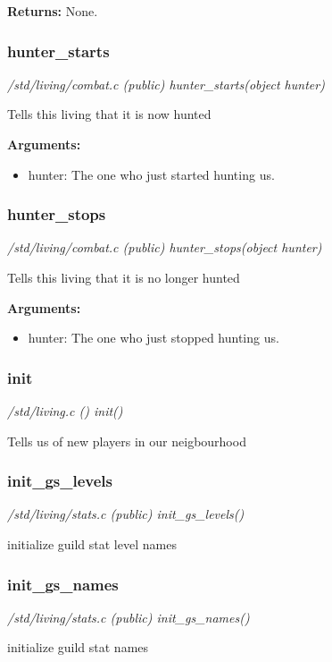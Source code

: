 {\bf Returns:}        None.


\subsubsection{hunter\_starts}

{\em /std/living/combat.c (public) hunter\_starts(object hunter)}

Tells this living that it is now hunted

{\bf Arguments:}
\begin{itemize}
\item     hunter: The one who just started hunting us.
\end{itemize}


\subsubsection{hunter\_stops}

{\em /std/living/combat.c (public) hunter\_stops(object hunter)}

Tells this living that it is no longer hunted

{\bf Arguments:}
\begin{itemize}
\item     hunter: The one who just stopped hunting us.
\end{itemize}


\subsubsection{init}

{\em /std/living.c () init()}

Tells us of new players in our neigbourhood


\subsubsection{init\_gs\_levels}

{\em /std/living/stats.c (public) init\_gs\_levels()}

initialize guild stat level names


\subsubsection{init\_gs\_names}

{\em /std/living/stats.c (public) init\_gs\_names()}

initialize guild stat names


